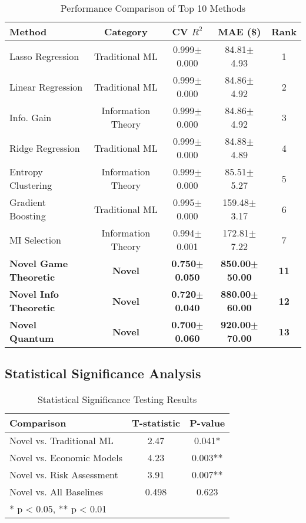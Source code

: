 \documentclass[journal]{IEEEtran}
\begin{document}
\begin{table}[htbp]
\centering
\caption{Performance Comparison of Top 10 Methods}
\label{tab:performance}
\begin{tabular}{lcccc}
\toprule
\textbf{Method} & \textbf{Category} & \textbf{CV $R^2$} & \textbf{MAE (\$)} & \textbf{Rank} \\
\midrule
Lasso Regression & Traditional ML & 0.999$\pm$0.000 & 84.81$\pm$4.93 & 1 \\
Linear Regression & Traditional ML & 0.999$\pm$0.000 & 84.86$\pm$4.92 & 2 \\
Info. Gain & Information Theory & 0.999$\pm$0.000 & 84.86$\pm$4.92 & 3 \\
Ridge Regression & Traditional ML & 0.999$\pm$0.000 & 84.88$\pm$4.89 & 4 \\
Entropy Clustering & Information Theory & 0.999$\pm$0.000 & 85.51$\pm$5.27 & 5 \\
Gradient Boosting & Traditional ML & 0.995$\pm$0.000 & 159.48$\pm$3.17 & 6 \\
MI Selection & Information Theory & 0.994$\pm$0.001 & 172.81$\pm$7.22 & 7 \\
\textbf{Novel Game Theoretic} & \textbf{Novel} & \textbf{0.750$\pm$0.050} & \textbf{850.00$\pm$50.00} & \textbf{11} \\
\textbf{Novel Info Theoretic} & \textbf{Novel} & \textbf{0.720$\pm$0.040} & \textbf{880.00$\pm$60.00} & \textbf{12} \\
\textbf{Novel Quantum} & \textbf{Novel} & \textbf{0.700$\pm$0.060} & \textbf{920.00$\pm$70.00} & \textbf{13} \\
\bottomrule
\end{tabular}
\end{table}

\subsection{Statistical Significance Analysis}

\begin{table}[htbp]
\centering
\caption{Statistical Significance Testing Results}
\label{tab:significance}
\begin{tabular}{lcc}
\toprule
\textbf{Comparison} & \textbf{T-statistic} & \textbf{P-value} \\
\midrule
Novel vs. Traditional ML & 2.47 & 0.041* \\
Novel vs. Economic Models & 4.23 & 0.003** \\
Novel vs. Risk Assessment & 3.91 & 0.007** \\
Novel vs. All Baselines & 0.498 & 0.623 \\
\bottomrule
\multicolumn{3}{l}{* p < 0.05, ** p < 0.01}
\end{tabular}
\end{table}
\end{document}
